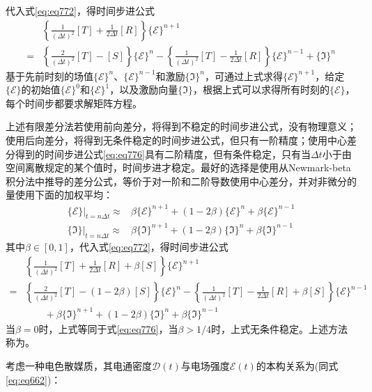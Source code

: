 \documentclass{article}
\numberwithin{equation}{section}
\renewcommand{\vec}[1]{\boldsymbol{#1}}
\begin{document}
代入式\ref{eq:eq772}，得时间步进公式
\begin{align}
    \label{eq:eq776}
     &\left\{\frac{1}{(\Delta t)^2}[T]+\frac{1}{2\Delta t}[R]\right\}\{\mathcal{E}\}^{n+1} \nonumber \\
    =&\left\{\frac{2}{(\Delta t)^2}[T]-[S]\right\}\{\mathcal{E}\}^{n}-\left\{\frac{1}{(\Delta t)^2}[T]-\frac{1}{2\Delta t}[R]\right\}\{\mathcal{E}\}^{n-1}+\{\mathfrak{I}\}^n
\end{align}
基于先前时刻的场值$\{\mathcal{E}\}^{n}$、$\{\mathcal{E}\}^{n-1}$和激励$\{\mathfrak{I}\}^n$，可通过上式求得$\{\mathcal{E}\}^{n+1}$，给定$\{\mathcal{E}\}$的初始值$\{\mathcal{E}\}^{0}$和$\{\mathcal{E}\}^{1}$，以及激励向量$\{\mathfrak{I}\}$，根据上式可以求得所有时刻的$\{\mathcal{E}\}$，每个时间步都要求解矩阵方程。\par
上述有限差分法若使用前向差分，将得到不稳定的时间步进公式，没有物理意义；使用后向差分，将得到无条件稳定的时间步进公式，但只有一阶精度；使用中心差分得到的时间步进公式\ref{eq:eq776}具有二阶精度，但有条件稳定，只有当$\Delta t$小于由空间离散规定的某个值时，时间步进才稳定。最好的选择是使用从Newmark-beta积分法中推导的差分公式，等价于对一阶和二阶导数使用中心差分，并对非微分的量使用下面的加权平均：
\begin{align}
    \label{eq:eq777}
    \left.\{\mathcal{E}\}\right|_{t=n\Delta t}\approx&\beta\{\mathcal{E}\}^{n+1}+(1-2\beta)\{\mathcal{E}\}^{n}+\beta\{\mathcal{E}\}^{n-1} \\
    \left.\{\mathfrak{I}\}\right|_{t=n\Delta t}\approx&\beta\{\mathfrak{I}\}^{n+1}+(1-2\beta)\{\mathfrak{I}\}^{n}+\beta\{\mathfrak{I}\}^{n-1}
\end{align}
其中$\beta\in[0,1]$，代入式\ref{eq:eq772}，得时间步进公式
\begin{align}
    \label{eq:eq778}
     &\left\{\frac{1}{(\Delta t)^2}[T]+\frac{1}{2\Delta t}[R]+\beta[S]\right\}\{\mathcal{E}\}^{n+1} \nonumber \\
    =&\left\{\frac{2}{(\Delta t)^2}[T]-(1-2\beta)[S]\right\}\{\mathcal{E}\}^{n}-\left\{\frac{1}{(\Delta t)^2}[T]-\frac{1}{2\Delta t}[R]+\beta[S]\right\}\{\mathcal{E}\}^{n-1} \nonumber \\
     &\qquad+\beta\{\mathfrak{I}\}^{n+1}+(1-2\beta)\{\mathfrak{I}\}^{n}+\beta\{\mathfrak{I}\}^{n-1}
\end{align}
当$\beta=0$时，上式等同于式\ref{eq:eq776}，当$\beta>1/4$时，上式无条件稳定。上述方法称为\textbf{\color{blue}{时域有限元法(FETD)}}。\par
考虑一种电色散媒质，其电通密度$\vec{\mathcal{D}}(t)$与电场强度$\vec{\mathcal{E}}(t)$的本构关系为(同式\ref{eq:eq662})：
\end{document}
